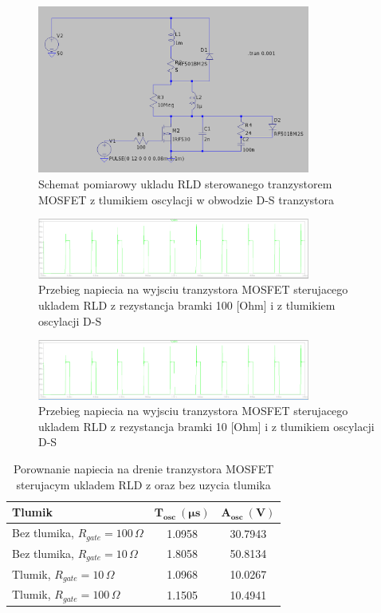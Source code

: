 \documentclass[11pt]{article}
\begin{document}
\begin{figure}[H]
\centering
\includegraphics[width=0.8\textwidth]{aun1_rld_with_snubber.png}
\caption{Schemat pomiarowy ukladu RLD sterowanego tranzystorem MOSFET z tlumikiem oscylacji w obwodzie D-S tranzystora}
\end{figure}

\begin{figure}[H]
\centering
\includegraphics[width=0.8\textwidth]{aun1_rld_with_snubber_rgate100ohm.png}
\caption{Przebieg napiecia na wyjsciu tranzystora MOSFET sterujacego ukladem RLD z rezystancja bramki 100 [Ohm] i z tlumikiem oscylacji D-S}
\end{figure}

\begin{figure}[H]
\centering
\includegraphics[width=0.8\textwidth]{aun1_rld_with_snubber_rgate10ohm.png}
\caption{Przebieg napiecia na wyjsciu tranzystora MOSFET sterujacego ukladem RLD z rezystancja bramki 10 [Ohm] i z tlumikiem oscylacji D-S}
\end{figure}

\begin{table}[H]
\centering
\begin{tabular}{|l|c|c|}
\hline
\textbf{Tlumik} & \(\mathbf{T_{osc} \ (\mu s)}\) & \(\mathbf{A_{osc} \ (V)}\) \\
\hline
Bez tlumika, \(R_{gate} = 100\,\Omega\) & 1.0958 & 30.7943 \\
\hline
Bez tlumika, \(R_{gate} = 10\,\Omega\) & 1.8058 & 50.8134 \\
\hline
Tlumik, \(R_{gate} = 10\,\Omega\) & 1.0968 & 10.0267 \\
\hline
Tlumik, \(R_{gate} = 100\,\Omega\) & 1.1505 & 10.4941 \\
\hline
\end{tabular}
\caption{Porownanie napiecia na drenie tranzystora MOSFET sterujacym ukladem RLD z oraz bez uzycia tlumika}
\label{tab:oscillation_data}
\end{table}
\end{document}

